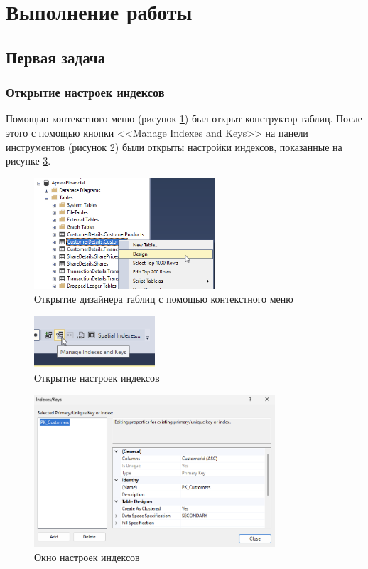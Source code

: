 \documentclass[a4paper, 14pt]{extarticle}
\begin{document}
\section{Выполнение работы}

\subsection{Первая задача}

\subsubsection{Открытие настроек индексов}

Помощью контекстного меню (рисунок \ref{fig:task-1-1}) был открыт конструктор
таблиц. После этого с помощью кнопки <<\foreignlanguage{english}{Manage Indexes
and Keys}>> на панели инструментов (рисунок \ref{fig:task-1-2}) были открыты
настройки индексов, показанные на рисунке \ref{fig:task-1-3}.

\begin{figure}[H]
  \centering
  \includegraphics[width=0.6\textwidth]{images/task-1/1.png}
  \caption{Открытие дизайнера таблиц с помощью контекстного меню}
  \label{fig:task-1-1}
\end{figure}

\begin{figure}[H]
  \centering
  \includegraphics[width=0.4\textwidth]{images/task-1/2.png}
  \caption{Открытие настроек индексов}
  \label{fig:task-1-2}
\end{figure}

\begin{figure}[H]
  \centering
  \includegraphics[width=0.8\textwidth]{images/task-1/3.png}
  \caption{Окно настроек индексов}
  \label{fig:task-1-3}
\end{figure}
\end{document}
